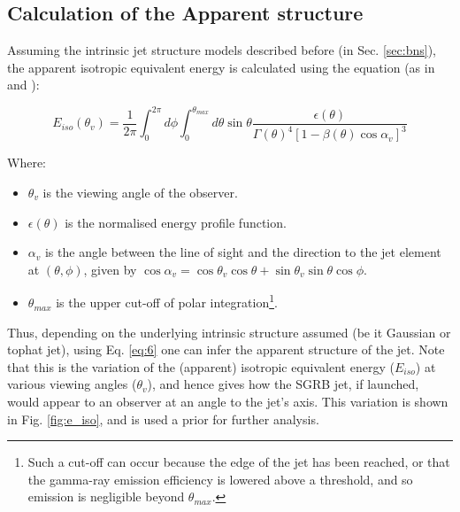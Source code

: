     \subsection{Calculation of the Apparent structure}

    Assuming the intrinsic jet structure models described before (in Sec.
    \ref{sec:bns}), the apparent isotropic equivalent energy is calculated using the
    equation (as in \cite{salafia_2015} and
    \cite{biscoveanu_2020}):

     \begin{equation}
         \label{eq:6}
         E_{iso}(\theta_v) =
             \dfrac{1}{2\pi}
             \int_{0}^{2\pi} d\phi \int_{0}^{\theta_{max}} d\theta
             \sin \theta
             \dfrac{\epsilon(\theta)}{\Gamma(\theta)^4
             [1 - \beta(\theta) \cos \alpha_v]^3}
     \end{equation}

    Where:
    \begin{itemize}

        \item $\theta_v$ is the viewing angle of the observer.

        \item $\epsilon(\theta)$ is the normalised energy profile function.

        \item $\alpha_v$ is the angle between the line of sight and the direction to the
            jet element at $(\theta, \phi)$, given by $\cos \alpha_v = \cos \theta_v
            \cos \theta + \sin \theta_v \sin \theta \cos \phi$.

        \item $\theta_{max}$ is the upper cut-off of polar integration\footnote
            {
                Such a cut-off can occur because the edge of the jet has been reached, or
                that the gamma-ray emission efficiency is lowered above a threshold, and
                so emission is negligible beyond $\theta_{max}$.
            }.

    \end{itemize}

    Thus, depending on the underlying intrinsic structure assumed (be it Gaussian or
    tophat jet), using Eq. \ref{eq:6} one can infer the apparent structure of the jet.
    Note that this is the variation of the (apparent) isotropic equivalent energy
    ($E_{iso}$) at various viewing angles ($\theta_v$), and hence gives how the SGRB
    jet, if launched, would appear to an observer at an angle to the jet's axis. This
    variation is shown in Fig. \ref{fig:e_iso}, and is used a prior for further
    analysis.

